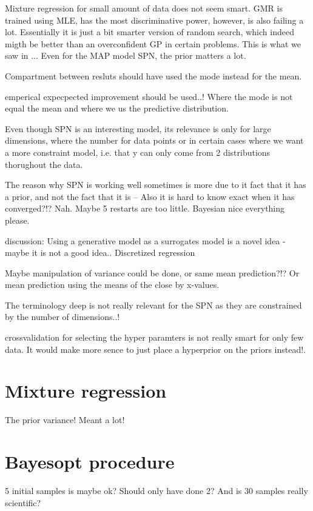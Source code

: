 Mixture regression for small amount of data does not seem smart. GMR is trained using MLE, has the most discriminative power,
however, is also failing a lot. Essentially it is just a bit smarter version of random search, which indeed migth be
better than an overconfident GP in certain problems. This is what we saw in ... Even for the MAP model SPN, the prior
matters a lot. 

Compartment between resluts should have used the mode instead for the mean. 

emperical expecpected improvement should be used..! Where the mode is not equal the mean and where we
us the predictive distribution. 

Even though SPN is an interesting model, its relevance is only for large dimensions, where the number for data points
or in certain cases where we want a more constraint model, i.e. that y can only come from 2 distributions thorughout the
data. 

The reason why SPN is working well sometimes is more due to it fact that it has a prior, 
and not the fact that it is -- Also it is hard to know exact when it has converged?!? Nah. 
Maybe 5 restarts are too little. Bayesian nice everything please. 


discussion: Using a generative model as a surrogates model is a novel idea - maybe it is not a good
idea.. Discretized regression

Maybe manipulation of variance could be done, or same mean prediction?!? Or 
mean prediction using the means of the close by x-values. 

The terminology deep is not really relevant for the SPN as they are constrained by the number of dimensions..!

crossvalidation for selecting the hyper paramters is not really smart for only few data. It would make more sence 
to just place a hyperprior on the priors instead!. 

\section{Mixture regression}
The prior variance! Meant a lot!



\section{Bayesopt procedure}
5 initial samples is maybe ok? Should only have done 2? 
And is 30 samples really scientific? 



